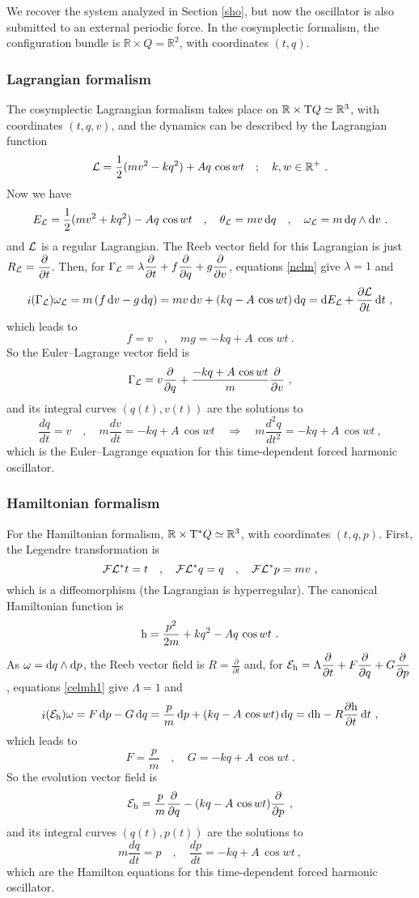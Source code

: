 \documentclass[12pt]{report}
\def\dst{\displaystyle}
\def\derpar#1#2{\frac{\partial{#1}}{\partial{#2}}}
\def\Lag{{\cal L}}
\def\d{{\rm d}}
\def\Real{\mathbb{R}}
\def\Tan{{\rm T}}
\def\inn{\mathop{i}\nolimits}
\def\Leg{{\cal F}\Lag}
\begin{document}
We recover the system analyzed in Section \ref{sho},
but now the oscillator is also submitted to an external periodic force.
In the cosymplectic formalism,
the configuration bundle is $\Real\times Q=\Real^2$, with coordinates $(t,q)$.

\subsubsection{Lagrangian formalism}

The cosymplectic Lagrangian formalism takes place on $\Real\times \Tan Q\simeq\Real^3$, with coordinates 
$(t,q,v)$, and the dynamics can be described by the Lagrangian function
$$
\Lag=\frac{1}{2}(mv^2-kq^2)+Aq\,\cos w t \quad ; \quad k,w\in\Real^+ \ .
$$
Now we have
$$
E_\Lag=\frac{1}{2}(mv^2+kq^2)-Aq\,\cos w t \quad , \quad
\theta_\Lag=mv\,\d q \quad , \quad
\omega_\Lag=m\,\d q\wedge\d v \ .
$$
and $\Lag$ is a regular Lagrangian.
The Reeb vector field for this Lagrangian is just $\dst R_\Lag=\derpar{}{t}$.
Then, for $\displaystyle \Gamma_\Lag=\lambda\derpar{}{t}+f\derpar{}{q}+g\derpar{}{v}$, 
equations \eqref{nelm} give $\lambda=1$ and
$$
\inn(\Gamma_\Lag)\omega_\Lag=
m\,(f\, \d v-g\, \d q)=
mv\, \d v+(kq-A\,\cos w t)\, \d q=\d E_\Lag+\derpar{\Lag}{t}\,\d t\ ,
$$
which leads to
$$
f=v \quad , \quad mg=-kq+A\,\cos w t \ .
$$
So the Euler--Lagrange vector field is
$$
\Gamma_\Lag=v\derpar{}{q}+\frac{-kq+A\,\cos w t}{m}\derpar{}{v} \ ,
$$
and its integral curves $(q(t),v(t))$ are the solutions to
$$
\frac{dq}{dt} =v \quad , \quad m\frac{dv}{dt}=-kq+A\,\cos w t
\quad \Longrightarrow \quad m\frac{d^2q}{dt^2}=-kq+A\,\cos w t  \ ,
$$
which is the Euler--Lagrange equation for this time-dependent forced harmonic oscillator.


\subsubsection{Hamiltonian formalism}


For the Hamiltonian formalism, $\Real\times\Tan^*Q\simeq\Real^3$,
with coordinates $(t,q,p)$. First, the Legendre transformation is
$$
\Leg^*t=t  \quad , \quad \Leg^*q=q  \quad , \quad \Leg^*p=mv  \ ,
$$
which is a diffeomorphism (the Lagrangian is hyperregular).
The canonical Hamiltonian function is
$$
{\rm h}=\frac{p^2}{2m}+kq^2-Aq\,\cos w t  \ .
$$
As $\omega=\d q\wedge\d p$, the Reeb vector field is $\dst R=\derpar{}{t}$ and,
for $\displaystyle {\cal E}_{\rm h}=\Lambda\derpar{}{t}+F\derpar{}{q}+G\derpar{}{p}$,
equations \eqref{celmh1} give $\Lambda=1$ and
$$
\inn({\cal E}_{\rm h})\omega= F\, \d p-G\, \d q=
\frac{p}{m}\, \d p+(kq-A\,\cos w t )\, \d q=\d{\rm h}-R\derpar{{\rm h}}{t}\,\d t\ ,
$$
which leads to
$$
F=\frac{p}{m} \quad , \quad G=-kq+A\,\cos w t  \ .
$$
So the evolution vector field is
$$
{\cal E}_{\rm h}=\frac{p}{m}\derpar{}{q}-(kq-A\,\cos w t)\derpar{}{p}\ ,
$$
and its integral curves $(q(t),p(t))$ are the solutions to
$$
m\frac{dq}{dt} =p \quad , \quad
\frac{dp}{dt}=-kq+A\,\cos w t \ ,
$$
which are the Hamilton equations for this time-dependent forced harmonic oscillator.
\end{document}
